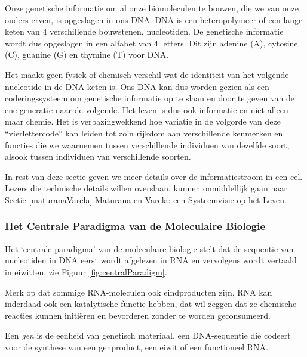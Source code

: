 \documentclass[
  11pt,
]{book}
\begin{document}
Onze genetische informatie om al onze biomoleculen te bouwen, die we van onze ouders erven, is opgeslagen in ons DNA. DNA is een heteropolymeer of een lange keten van 4 verschillende bouwstenen, nucleotiden. De genetische informatie wordt dus opgeslagen in een alfabet van 4 letters. Dit zijn adenine (A), cytosine (C), guanine (G) en thymine (T) voor DNA.

Het maakt geen fysiek of chemisch verschil wat de identiteit van het volgende nucleotide in de DNA-keten is. Ons DNA kan dus worden gezien als een coderingssysteem om genetische informatie op te slaan en door te geven van de ene generatie naar de volgende. Het leven is dus ook informatie en niet alleen maar chemie. Het is verbazingwekkend hoe variatie in de volgorde van deze ``vierlettercode'' kan leiden tot zo'n rijkdom aan verschillende kenmerken en functies die we waarnemen tussen verschillende individuen van dezelfde soort, alsook tussen individuen van verschillende soorten.

In rest van deze sectie geven we meer details over de informatiestroom in een cel. Lezers die technische details willen overslaan, kunnen onmiddellijk gaan naar Sectie \ref{maturanaVarela} Maturana en Varela: een Systeemvisie op het Leven.

\hypertarget{het-centrale-paradigma-van-de-moleculaire-biologie}{%
\subsubsection{Het Centrale Paradigma van de Moleculaire Biologie}\label{het-centrale-paradigma-van-de-moleculaire-biologie}}

Het `centrale paradigma' van de moleculaire biologie stelt dat de sequentie van nucleotiden in DNA eerst wordt afgelezen in RNA en vervolgens wordt vertaald in eiwitten, zie Figuur \ref{fig:centralParadigm}.

Merk op dat sommige RNA-moleculen ook eindproducten zijn. RNA kan inderdaad ook een katalytische functie hebben, dat wil zeggen dat ze chemische reacties kunnen initiëren en bevorderen zonder te worden geconsumeerd.

Een \emph{gen} is de eenheid van genetisch materiaal, een DNA-sequentie die codeert voor de synthese van een genproduct, een eiwit of een functioneel RNA.
\end{document}
